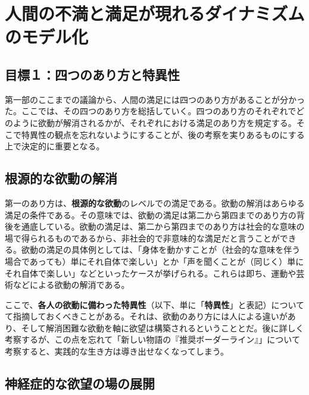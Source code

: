 \section{人間の不満と満足が現れるダイナミズムのモデル化}\label{ux4ebaux9593ux306eux4e0dux6e80ux3068ux6e80ux8db3ux304cux73feux308cux308bux30c0ux30a4ux30caux30dfux30baux30e0ux306eux30e2ux30c7ux30ebux5316}

\subsection{目標１：四つのあり方と特異性}\label{ux76eeux6a19uxff11ux56dbux3064ux306eux3042ux308aux65b9ux3068ux7279ux7570ux6027}

第一部のここまでの議論から、人間の満足には四つのあり方があることが分かった。ここでは、その四つのあり方を総括していく。四つのあり方のそれぞれでどのように欲動が解消されるかが、それぞれにおける満足のあり方を規定する。そこで特異性の観点を忘れないようにすることが、後の考察を実りあるものにする上で決定的に重要となる。

\subsection{根源的な欲動の解消}\label{ux6839ux6e90ux7684ux306aux6b32ux52d5ux306eux89e3ux6d88}

第一のあり方は、\textbf{根源的な欲動}のレベルでの満足である。欲動の解消はあらゆる満足の条件である。その意味では、欲動の満足は第二から第四までのあり方の背後を通底している。欲動の満足は、第二から第四までのあり方は社会的な意味の場で得られるものであるから、非社会的で非意味的な満足だと言うことができる。欲動の満足の具体例としては、「身体を動かすことが（社会的な意味を伴う場合であっても）単にそれ自体で楽しい」とか「声を聞くことが（同じく）単にそれ自体で楽しい」などといったケースが挙げられる。これらは即ち、運動や芸術などによる欲動の解消である。

ここで、\textbf{各人の欲動に備わった特異性}（以下、単に「\textbf{特異性}」と表記）についてて指摘しておくべきことがある。それは、欲動のあり方には人による違いがあり、そして解消困難な欲動を軸に欲望は構築されるということとだ。後に詳しく考察するが、この点を忘れて「新しい物語の『推奨ボーダーライン』」について考察すると、実践的な生き方は導き出せなくなってしまう。

\subsection{神経症的な欲望の場の展開}\label{ux795eux7d4cux75c7ux7684ux306aux6b32ux671bux306eux5834ux306eux5c55ux958b}

